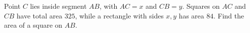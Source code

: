 Point $C$ lies inside segment $AB$, with $AC=x$ and $CB=y$. Squares on $AC$ and $CB$ have total area $325$, while a rectangle with sides $x,y$ has area $84$. Find the area of a square on $AB$.
